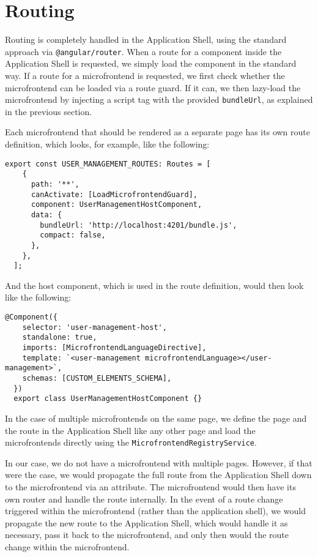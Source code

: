 \section{Routing}
Routing is completely handled in the Application Shell, using the standard approach via \texttt{@angular/router}. When a route for a component inside the Application Shell is requested, we simply load the component in the standard way. If a route for a microfrontend is requested, we first check whether the microfrontend can be loaded via a route guard. If it can, we then lazy-load the microfrontend by injecting a script tag with the provided \texttt{bundleUrl}, as explained in the previous section. 

Each microfrontend that should be rendered as a separate page has its own route definition, which looks, for example, like the following:
\begin{lstlisting}[caption={Route configuration for the User Microfrontend}]
  export const USER_MANAGEMENT_ROUTES: Routes = [
    {
      path: '**',
      canActivate: [LoadMicrofrontendGuard],
      component: UserManagementHostComponent,
      data: {
        bundleUrl: 'http://localhost:4201/bundle.js',
        compact: false,
      },
    },
  ];
\end{lstlisting}
And the host component, which is used in the route definition, would then look like the following:
\begin{lstlisting}[caption={Host component for the User Microfrontend}]
  @Component({
    selector: 'user-management-host',
    standalone: true,
    imports: [MicrofrontendLanguageDirective],
    template: `<user-management microfrontendLanguage></user-management>`,
    schemas: [CUSTOM_ELEMENTS_SCHEMA],
  })
  export class UserManagementHostComponent {}
\end{lstlisting}
In the case of multiple microfrontends on the same page, we define the page and the route in the Application Shell like any other page and load the microfrontends directly using the \texttt{MicrofrontendRegistryService}.

In our case, we do not have a microfrontend with multiple pages. However, if that were the case, we would propagate the full route from the Application Shell down to the microfrontend via an attribute. The microfrontend would then have its own router and handle the route internally. In the event of a route change triggered within the microfrontend (rather than the application shell), we would propagate the new route to the Application Shell, which would handle it as necessary, pass it back to the microfrontend, and only then would the route change within the microfrontend.